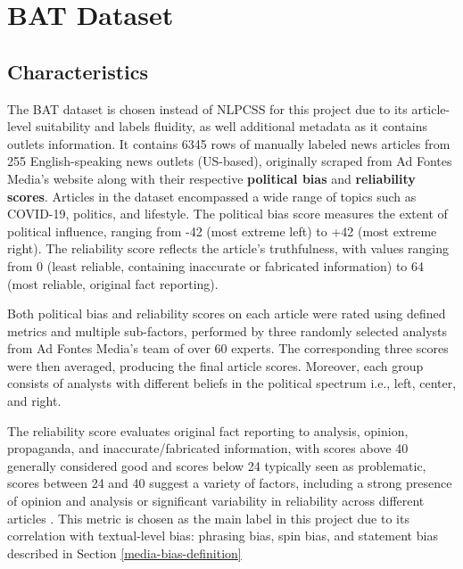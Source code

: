 \chapter{BAT Dataset}
\label{cha:3}

\section{Characteristics} \label{bat-characteristics}

The BAT dataset \cite{spinde-2023-bat} is chosen instead of NLPCSS \cite{chen-2020-nlpcss} for this project due to its article-level suitability and labels fluidity, as well additional metadata as it contains outlets information. It contains 6345 rows of manually labeled news articles from 255 English-speaking news outlets (US-based), originally scraped from Ad Fontes Media's website along with their respective \textbf{political bias} and \textbf{reliability scores}. Articles in the dataset encompassed a wide range of topics such as COVID-19, politics, and lifestyle. The political bias score measures the extent of political influence, ranging from -42 (most extreme left) to +42 (most extreme right). The reliability score reflects the article's truthfulness, with values ranging from 0 (least reliable, containing inaccurate or fabricated information) to 64 (most reliable, original fact reporting).

Both political bias and reliability scores on each article were rated using defined metrics and multiple sub-factors, performed by three randomly selected analysts from Ad Fontes Media's team of over 60 experts. The corresponding three scores were then averaged, producing the final article scores. Moreover, each group consists of analysts with different beliefs in the political spectrum i.e., left, center, and right.

The reliability score evaluates original fact reporting to analysis, opinion, propaganda, and inaccurate/fabricated information, with scores above 40 generally considered good and scores below 24 typically seen as problematic, scores between 24 and 40 suggest a variety of factors, including a strong presence of opinion and analysis or significant variability in reliability across different articles \cite{adfontes}. This metric is chosen as the main label in this project due to its correlation with textual-level bias: phrasing bias, spin bias, and statement bias described in Section \ref{media-bias-definition}


